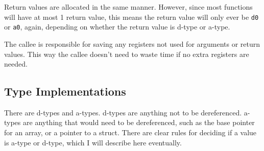 Return values are allocated in the same manner. However, since most
functions will have at most 1 return value, this means the return value
will only ever be {\tt d0} or {\tt a0}, again, depending on whether the
return value is d-type or a-type.

The callee is responsible for saving any registers not used for arguments
or return values. This way the callee doesn't need to waste time if no
extra registers are needed.

\subsection{Type Implementations}
\label{subsec:abitypes}

There are d-types and a-types. d-types are anything not to be
dereferenced. a-types are anything that would need to be dereferenced,
such as the base pointer for an array, or a pointer to a struct. There
are clear rules for deciding if a value is a-type or d-type, which I
will describe here eventually.
